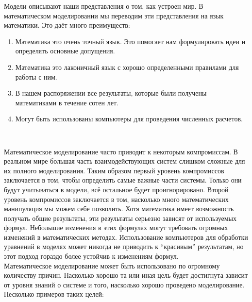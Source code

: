 
\graphicspath{ {imgs/} }




Модели описывают наши представления о том, как устроен мир. В математическом моделировании мы переводим эти представления на язык математики. Это даёт много преимуществ: \\

\begin{enumerate}
  \item Математика это очень точный язык. Это помогает нам формулировать идеи и определять основные допущения.
  \item Математика это лаконичный язык с хорошо определенными правилами для работы с ним.
  \item В нашем распоряжении все результаты, которые были получены математиками в течение сотен лет.
  \item Могут быть использованы компьютеры для проведения численных расчетов.
\end{enumerate}
\ 

Математическое моделирование часто приводит к некоторым компромиссам. В реальном мире большая часть взаимодействующих систем слишком сложные для их полного моделирования. Таким образом первый уровень компромиссов заключается в том, чтобы определить самые важные части системы. Только они будут учитываться в модели, всё остальное будет проигнорировано. Второй уровень компромиссов заключается в том, насколько много математических манипуляция мы можем себе позволить. Хотя математика имеет возможность получать общие результаты, эти результаты серьезно зависят от используемых формул. Небольшие изменения в этих формулах могут требовать огромных изменений в математических методах. Использование компьютеров для обработки уравнений в моделях может никогда не приводить к ``красивым'' результатам, но этот подход гораздо более устойчив к изменениям формул. \\

Математическое моделирование может быть использовано по огромному количеству причин. Насколько хорошо та или иная цель будет достигнута зависит от уровня знаний о системе и того, насколько хорошо проведено моделирование. Несколько примеров таких целей: \\

